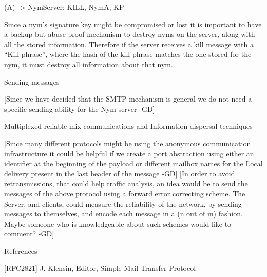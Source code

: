 (A) -> NymServer: {KILL, NymA, KP}

Since a nym's signature key might be compromised or lost it is
important to have a backup but abuse-proof mechanism to destroy nyms
on the server, along with all the stored information. Therefore if the
server receives a kill message with a ``Kill phrase'', where the hash
of the kill phrase matches the one stored for the nym, it must destroy
all information about that nym.

Sending messages

[Since we have decided that the SMTP mechanism is general we do not
  need a specific sending ability for the Nym server -GD]

Multiplexed reliable mix communications and Information dispersal techniques

[Since many different protocols might be using the anonymous
  communication infrastructure it could be helpful if we create a port
  abstraction using either an identifier at the beginning of the
  payload or different mailbox names for the Local delivery present in
  the last header of the message -GD] 
[In order to avoid retransmissions, that could help traffic analysis,
  an idea would be to send the messages of the above protocol using a
  forward error correcting scheme. The Server, and clients, could
  measure the reliability of the network, by sending messages to
  themselves, and encode each message in a (n out of m) fashion. Maybe
  someone who is knowledgeable about such schemes would like to comment? -GD]

References

[RFC2821] J. Klensin, Editor, Simple Mail Transfer Protocol

